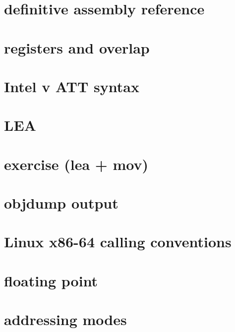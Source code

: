 \section{definitive assembly reference}



\section{registers and overlap}



\section{Intel v ATT syntax}



\section{LEA}


\section{exercise (lea + mov)}



\section{objdump output}


\section{Linux x86-64 calling conventions}


\section{floating point}




\section{addressing modes} %

